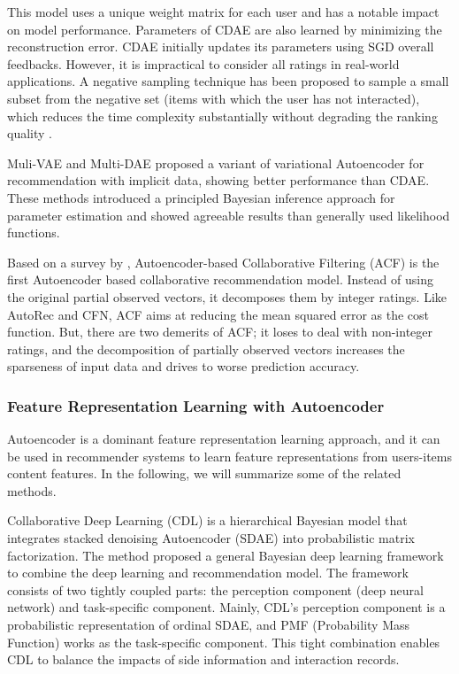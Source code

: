 \documentclass[a4paper,fleqn]{cas-dc}
\begin{document}
This model uses a unique weight matrix for each user and has a notable impact on model performance. Parameters of CDAE are also learned by minimizing the reconstruction error. CDAE initially updates its parameters using SGD overall feedbacks. However, it is impractical to consider all ratings in real-world applications. A negative sampling technique has been proposed to sample a small subset from the negative set (items with which the user has not interacted), which reduces the time complexity substantially without degrading the ranking quality \citep{29zhang2019a}.


Muli-VAE and Multi-DAE \citep{32liang2018a} proposed a variant of variational Autoencoder for recommendation with implicit data, showing better performance than CDAE. These methods introduced a principled Bayesian inference approach for parameter estimation and showed agreeable results than generally used likelihood functions.

Based on a survey by \citet{29zhang2019a}, Autoencoder-based Collaborative Filtering (ACF) \citep{33ouyang2014a} is the first Autoencoder based collaborative recommendation model. Instead of using the original partial observed vectors, it decomposes them by integer ratings. Like AutoRec and CFN, ACF aims at reducing the mean squared error as the cost function. But, there are two demerits of ACF; it loses to deal with non-integer ratings, and the decomposition of partially observed vectors increases the sparseness of input data and drives to worse prediction accuracy.


\subsubsection{Feature Representation Learning with Autoencoder}
Autoencoder is a dominant feature representation learning approach, and it can be used in recommender systems to learn feature representations from users-items content features. In the following, we will summarize some of the related methods.

Collaborative Deep Learning (CDL) \citep{34wang2015b} is a hierarchical Bayesian model that integrates stacked denoising Autoencoder (SDAE) into probabilistic matrix factorization. The method proposed a general Bayesian deep learning framework \citep{35wang2016a} to combine the deep learning and recommendation model. The framework consists of two tightly coupled parts: the perception component (deep neural network) and task-specific component. Mainly, CDL's perception component is a probabilistic representation of ordinal SDAE, and PMF (Probability Mass Function) works as the task-specific component. This tight combination enables CDL to balance the impacts of side information and interaction records.
\end{document}
